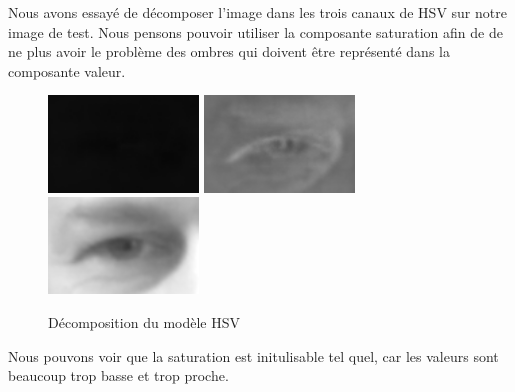 Nous avons essayé de décomposer l'image dans les trois canaux de HSV sur notre image de test. Nous pensons pouvoir
utiliser la composante saturation afin de de ne plus avoir le problème des ombres qui doivent être représenté dans la composante valeur.

\begin{figure}[H]
 \center
 \includegraphics[width=4cm]{image/hue.png}
 \includegraphics[width=4cm]{image/saturation.png}
 \includegraphics[width=4cm]{image/value.png}
 \caption{Décomposition du modèle HSV}
\end{figure}

Nous pouvons voir que la saturation est initulisable tel quel, car les valeurs sont beaucoup trop basse et trop proche.

